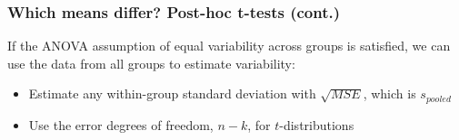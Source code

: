 \documentclass[slidestop,compress,mathserif]{beamer}
\begin{document}
\begin{frame}
\frametitle{Which means differ? Post-hoc t-tests (cont.)}

If the ANOVA assumption of equal variability across groups is satisfied, we can use the data from all groups to estimate variability:
    
\begin{itemize}

\item Estimate any within-group standard deviation with $\sqrt{MSE}$, which is $s_{pooled}$

\item Use the error degrees of freedom, $n - k$, for $t$-distributions

\end{itemize}


\end{frame}

\end{document}
